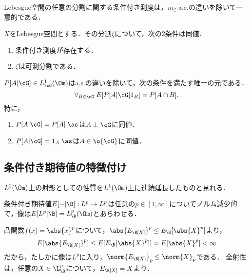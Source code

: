 \documentclass[uplatex,dvipdfmx]{jsreport}
\begin{document}
\begin{proposition}[一意性]
    Lebesgue空間の任意の分割に関する条件付き測度は，$m_\zeta$-a.e.の違いを除いて一意的である．
\end{proposition}

\begin{proposition}[存在]
    $X$をLebesgue空間とする．その分割$\zeta$について，次の2条件は同値．
    \begin{enumerate}
        \item 条件付き測度が存在する．
        \item $\zeta$は可測分割である．
    \end{enumerate}
\end{proposition}

\begin{proposition}[特徴付け]
    $P[A|\cG]\in L^1_\cG(\Om)$はa.s.の違いを除いて，次の条件を満たす唯一の元である．
    \[\forall_{B\in\cG}\;E[P[A|\cG]1_B]=P[A\cap B].\]
    特に，
    \begin{enumerate}
        \item $P[A|\cG]=P[A]\;\as$は$A\perp\cG$に同値．
        \item $P[A|\cG]=1_A\;\as$は$A\in\o{\cG}$に同値．
    \end{enumerate}
\end{proposition}

\subsection{条件付き期待値の特徴付け}

\begin{tcolorbox}[colframe=ForestGreen, colback=ForestGreen!10!white,breakable,colbacktitle=ForestGreen!40!white,coltitle=black,fonttitle=\bfseries\sffamily,
title=]
    $L^2(\Om)$上の射影としての性質を$L^1(\Om)$上に連続延長したものと見れる．
\end{tcolorbox}

\begin{corollary}[Jensenの不等式の系]
    条件付き期待値$E[-|\B]:L^p\to L^p$は任意の$p\in[1,\infty]$についてノルム減少的で，像は$E[L^p|\B]= L^p_\B(\Om)$とあらわせる．
\end{corollary}
\begin{Proof}
    凸関数$f(x)=\abs{x}^p$について，$\abs{E_\B[X]}^p\le E_\B[\abs{X}^p]$より，
    \[E[\abs{E_\B[X]}^p]\le E[E_\B[\abs{X}^p]]=E[\abs{X}^p]<\infty\]
    だから，たしかに像は$L^p$に入り，$\norm{E_\B[X]}_p\le\norm{X}_p$である．
    全射性は，任意の$X\in\L_\B^p$について，$E_\B[X]=X$より．
\end{Proof}
\end{document}
